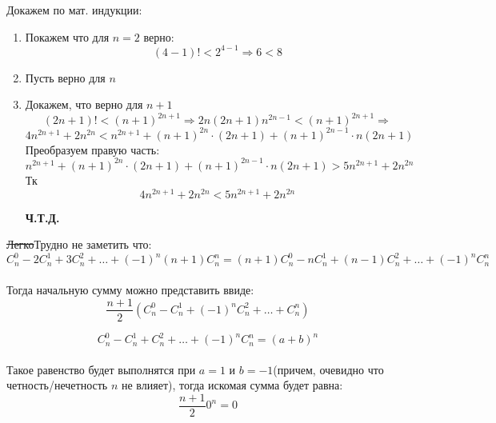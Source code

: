 \documentclass{report}
\begin{document}
\sol
Докажем по мат. индукции:
\begin{enumerate}
	\item Покажем что для $n=2$ верно: \\
		\begin{equation*}
			(4-1)!<2^{4-1} \Rightarrow 6<8
		\end{equation*}

	\item Пусть верно для $n$ \\
	\item Докажем, что верно для $n+1$ \\
		\begin{equation*}
			(2n+1)!<(n+1)^{2n+1} \Rightarrow 2n(2n+1)n^{2n-1}<(n+1)^{2n+1} \Rightarrow 
		\end{equation*}
		\begin{equation*}
			4n^{2n+1}+2n^{2n}<n^{2n+1}+(n+1)^{2n}\cdot(2n+1)+(n+1)^{2n-1}\cdot n(2n+1)
		\end{equation*}
		Преобразуем правую часть:
		\begin{equation*}
			n^{2n+1}+(n+1)^{2n}\cdot(2n+1)+(n+1)^{2n-1}\cdot n(2n+1)>5n^{2n+1}+2n^{2n}
		\end{equation*}
		Тк
		\begin{equation*}
			4n^{2n+1}+2n^{2n}<5n^{2n+1}+2n^{2n}
		\end{equation*}
		\begin{center}
		\textbf{Ч.Т.Д.}
		\end{center}
\end{enumerate}

\sol
\sout{Легко}Трудно не заметить что:\\

\begin{equation*}
C_n^0-2C_n^1+3C_n^2+\ldots+(-1)^n(n+1)C_n^n=(n+1)C_n^0-nC_n^1+(n-1)C_n^2+\ldots+(-1)^nC_n^n
\end{equation*}
\\
Тогда начальную сумму можно представить ввиде:
\begin{equation*}
\dfrac{n+1}{2}(C_n^0-C_n^1+(-1)^nC_n^2+\ldots+C_n^n)
\end{equation*}

\begin{equation*}
C_n^0-C_n^1+C_n^2+\ldots+(-1)^nC_n^n=(a+b)^n
\end{equation*}
\\
Такое равенство будет выполнятся при $a=1$ и $b=-1$(причем, очевидно что четность/нечетность $n$ не влияет), тогда искомая сумма будет равна:
\begin{equation*}
\dfrac{n+1}{2}0^n=0
\end{equation*}
\end{document}
